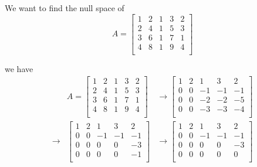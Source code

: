 \begin{example}
    We want to find the null space of
    \begin{equation*}
        A = \begin{bmatrix}
            1 & 2 & 1 & 3 & 2 \\
            2 & 4 & 1 & 5 & 3 \\
            3 & 6 & 1 & 7 & 1 \\
            4 & 8 & 1 & 9 & 4 \\
        \end{bmatrix}
    \end{equation*}

    we have
    \begin{align*}
                    & A = \begin{bmatrix}
            1 & 2 & 1 & 3 & 2 \\
            2 & 4 & 1 & 5 & 3 \\
            3 & 6 & 1 & 7 & 1 \\
            4 & 8 & 1 & 9 & 4 \\
        \end{bmatrix} & \rightarrow \begin{bmatrix}
            1 & 2 & 1  & 3  & 2  \\
            0 & 0 & -1 & -1 & -1 \\
            0 & 0 & -2 & -2 & -5 \\
            0 & 0 & -3 & -3 & -4 \\
        \end{bmatrix} \\
        \rightarrow & \begin{bmatrix}
            1 & 2 & 1  & 3  & 2  \\
            0 & 0 & -1 & -1 & -1 \\
            0 & 0 & 0  & 0  & -3 \\
            0 & 0 & 0  & 0  & -1 \\
        \end{bmatrix}     & \rightarrow \begin{bmatrix}
            1 & 2 & 1  & 3  & 2  \\
            0 & 0 & -1 & -1 & -1 \\
            0 & 0 & 0  & 0  & -3 \\
            0 & 0 & 0  & 0  & 0  \\
        \end{bmatrix} \\
    \end{align*}


\end{example}
